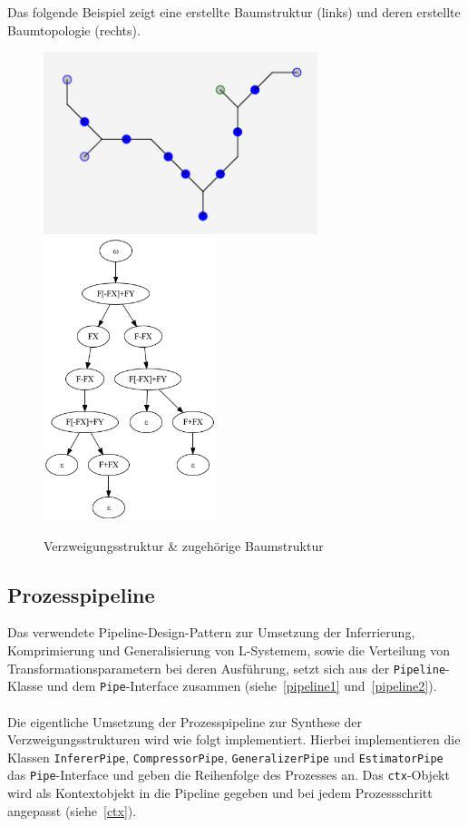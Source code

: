 Das folgende Beispiel zeigt eine erstellte Baumstruktur (links) und deren erstellte Baumtopologie (rechts).
\begin{figure}[H]
    \centering
    \includegraphics[width=8cm]{../images/graph_tree.png}
    \includegraphics[width=5cm]{../images/tree_graph.png}
    \caption{Verzweigungsstruktur \& zugehörige Baumstruktur}
\end{figure}

\subsection*{Prozesspipeline}
Das verwendete Pipeline-Design-Pattern zur Umsetzung der Inferrierung, Komprimierung und Generalisierung von L-Systemem,
sowie die Verteilung von Transformationsparametern bei deren Ausführung, setzt sich aus der \texttt{Pipeline}-Klasse und
dem \texttt{Pipe}-Interface zusammen (siehe~\ref{pipeline1} und~\ref{pipeline2}).\\~\\
Die eigentliche Umsetzung der Prozesspipeline zur Synthese der Verzweigungsstrukturen wird wie folgt implementiert.
Hierbei implementieren die Klassen \texttt{InfererPipe}, \texttt{CompressorPipe}, \texttt{GeneralizerPipe} und
\texttt{EstimatorPipe} das \texttt{Pipe}-Interface und geben die Reihenfolge des Prozesses an.
Das \texttt{ctx}-Objekt wird als Kontextobjekt in die Pipeline gegeben und bei jedem Prozessschritt angepasst (siehe~\ref{ctx}).

